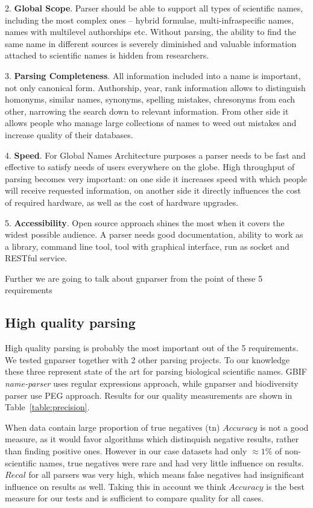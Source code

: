 \documentclass{bmcart}
\begin{document}
2. \textbf{Global Scope}. Parser should be able to support all types of
scientific names, including the most complex ones -- hybrid formulae,
multi-infraspecific names, names with multilevel authorships etc. Without
parsing, the ability to find the same name in different sources is severely
diminished and valuable information attached to scientific names is hidden
from researchers.

3. \textbf{Parsing Completeness}. All information included into a name is
important, not only canonical form. Authorship, year, rank information allows
to distinguish homonyms, similar names, synonyms, spelling mistakes,
chresonyms from each other, narrowing the search down to relevant information.
From other side it allows people who manage large collections of names to weed
out mistakes and increase quality of their databases.

4. \textbf{Speed}. For Global Names Architecture purposes a parser needs to be
fast and effective to satisfy needs of users everywhere on the globe.  High
throughput of parsing becomes very important: on one side it increases speed
with which people will receive requested information, on another side it
directly influences the cost of required hardware, as well as the cost of
hardware upgrades.

5. \textbf{Accessibility}. Open source approach shines the most when it covers
the widest possible audience. A parser needs good documentation, ability to
work as a library, command line tool, tool with graphical interface, run as
socket and RESTful service.

Further we are going to talk about gnparser from the point of these 5
requirements

\subsection*{High quality parsing}

High quality parsing is probably the most important out of the 5 requirements.
We tested gnparser together with 2 other parsing projects. To our knowledge
these three represent state of the art for parsing biological scientific names.
GBIF \textit{name-parser} uses regular expressions approach, while gnparser and
biodiversity parser use PEG approach. Results for our quality measurements are
shown in Table~\ref{table:precision}.

When data contain large proportion of true negatives ($\text{tn}$) $Accuracy$
is not a good measure, as it would favor algorithms which distinquish negative
results, rather than finding positive ones. However in our case datasets had
only $\approx1\%$ of non-scientific names, true negatives were rare and had
very little influence on results. $Recal$ for all parsers was very high, which
means false negatives had insignificant influence on results as well. Taking
this in account we think $Accuracy$ is the best measure for our tests and
is sufficient to compare quality for all cases.
\end{document}
